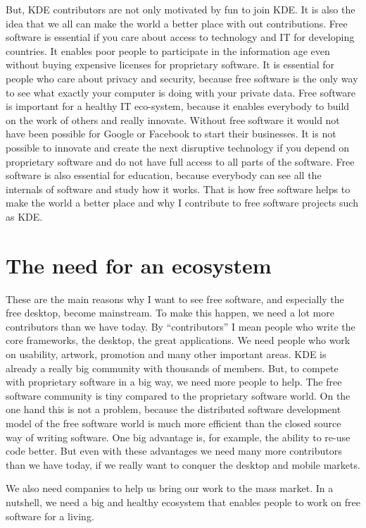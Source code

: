 But, KDE contributors are not only motivated by fun to join KDE. It is also the idea that we all can make the world a better place with out contributions. Free software is essential if you care about access to technology and IT for developing countries. It enables poor people to participate in the information age even without buying expensive licenses for proprietary software. It is essential for people who care about privacy and security, because free software is the only way to see what exactly your computer is doing with your private data. Free software is important for a healthy IT eco-system, because it enables everybody to build on the work of others and really innovate. Without free software it would not have been possible for Google or Facebook to start their businesses. It is not possible to innovate and create the next disruptive technology if you depend on proprietary software and do not have full access to all parts of the software.
Free software is also essential for education, because everybody can see all the internals of software and study how it works. That is how free software helps to make the world a better place and why I contribute to free software projects such as KDE. 

\section*{The need for an ecosystem}

These are the main reasons why I want to see free software, and especially the free desktop, become mainstream. To make this happen, we need a lot more contributors than we have today. By ``contributors'' I mean people who write the core frameworks, the desktop, the great applications. We need people who work on usability, artwork, promotion and many other important areas. KDE is already a really big community with thousands of members. But, to compete with proprietary software in a big way, we need more people to help. The free software community is tiny compared to the proprietary software world. On the one hand this is not a problem, because the distributed software development model of the free software world is much more efficient than the closed source way of writing software. One big advantage is, for example, the ability to re-use code better. But even with these advantages we need many more contributors than we have today, if we really want to conquer the desktop and mobile markets.

We also need companies to help us bring our work to the mass market. In a nutshell, we need a big and healthy ecosystem that enables people to work on free software for a living.

